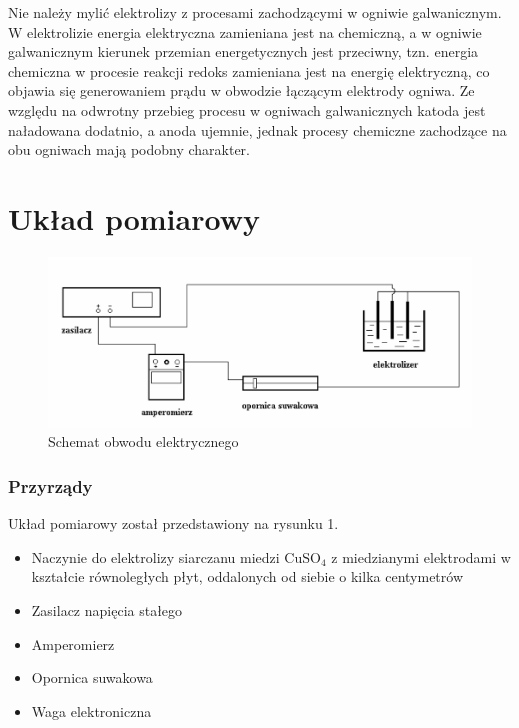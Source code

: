 \documentclass[a4paper,11pt]{article}
\begin{document}
\indent Nie należy mylić elektrolizy z procesami zachodzącymi w ogniwie galwanicznym. W elektrolizie energia elektryczna zamieniana jest na chemiczną, a w ogniwie galwanicznym kierunek przemian energetycznych jest przeciwny, tzn. energia chemiczna w procesie reakcji redoks zamieniana jest na energię elektryczną, co objawia się generowaniem prądu w obwodzie łączącym elektrody ogniwa. Ze względu na odwrotny przebieg procesu w ogniwach galwanicznych katoda jest naładowana dodatnio, a anoda ujemnie, jednak procesy chemiczne zachodzące na obu ogniwach mają podobny charakter.

\section{Układ pomiarowy}
\begin{figure}[h!]
\label{rys:1}
\centering
\includegraphics[width=0.7\linewidth]{./uklad}
\caption{Schemat obwodu elektrycznego}
\label{fig:uklad}
\end{figure}

\subsubsection*{Przyrządy}
Układ pomiarowy został przedstawiony na rysunku 1.
\begin{itemize}
\item Naczynie do elektrolizy siarczanu miedzi $\text{CuSO}_4$ z miedzianymi elektrodami w kształcie
równoległych płyt, oddalonych od siebie o kilka centymetrów
\item Zasilacz napięcia stałego
\item Amperomierz
\item Opornica suwakowa
\item Waga elektroniczna
\end{itemize}
\end{document}
